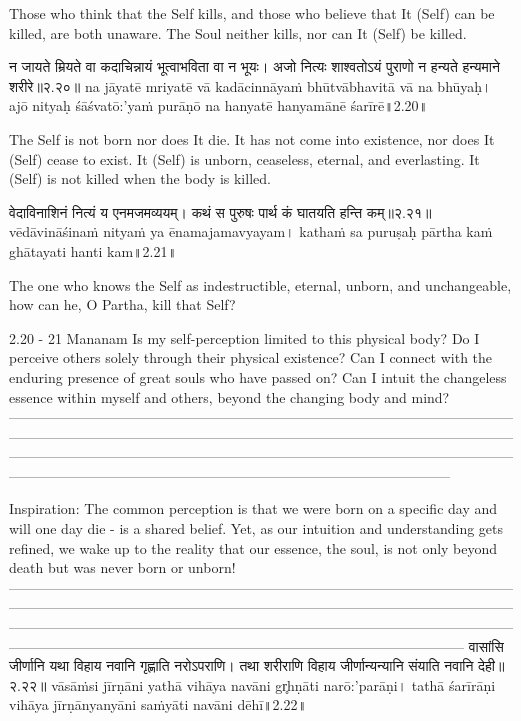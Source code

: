 Those who think that the Self kills, and those who believe that It (Self) can be killed, are both unaware. The Soul neither kills, nor can It (Self) be killed. 


न जायते म्रियते वा कदाचिन्नायं भूत्वाभविता वा न भूयः। 
अजो नित्यः शाश्वतोऽयं पुराणो न हन्यते हन्यमाने शरीरे॥२.२०॥
na jāyatē mriyatē vā kadācinnāyaṁ bhūtvābhavitā vā na bhūyaḥ। 
ajō nityaḥ śāśvatō:'yaṁ purāṇō na hanyatē hanyamānē śarīrē॥2.20॥

The Self is not born nor does It die. It has not come into existence, nor does It (Self) cease to exist. It (Self) is unborn, ceaseless, eternal, and everlasting. It (Self) is not killed when the body is killed. 


वेदाविनाशिनं नित्यं य एनमजमव्ययम्। 
कथं स पुरुषः पार्थ कं घातयति हन्ति कम्॥२.२१॥
vēdāvināśinaṁ nityaṁ ya ēnamajamavyayam। 
kathaṁ sa puruṣaḥ pārtha kaṁ ghātayati hanti kam॥2.21॥

The one who knows the Self as indestructible, eternal, unborn, and unchangeable, how can he, O Partha, kill that Self?

2.20 - 21 Mananam
Is my self-perception limited to this physical body? Do I perceive others solely through their physical existence? Can I connect with the enduring presence of great souls who have passed on? Can I intuit the changeless essence within myself and others, beyond the changing body and mind?
—--------------------------------------------------------------------------------------------------------------------------------------------------------------------------------------------------------------------------------------------------------------------------------------------------------------------------------------------------------------------------------------------------------------------------------

Inspiration:
The common perception is that we were born on a specific day and will one day die -  is a shared belief. Yet, as our intuition and understanding gets refined, we wake up to the reality that our essence, the soul, is not only beyond death but was never born or unborn!
—-----------------------------------------------------------------------------------------------------------------------------------------------------------------------------------------------------------------------------------------------------------------------------------------------------------------------------------------------------------------------------------------------------------------------------------
वासांसि जीर्णानि यथा विहाय नवानि गृह्णाति नरोऽपराणि। 
तथा शरीराणि विहाय जीर्णान्यन्यानि संयाति नवानि देही॥२.२२॥
vāsāṁsi jīrṇāni yathā vihāya navāni gr̥hṇāti narō:'parāṇi। 
tathā śarīrāṇi vihāya jīrṇānyanyāni saṁyāti navāni dēhī॥2.22॥

